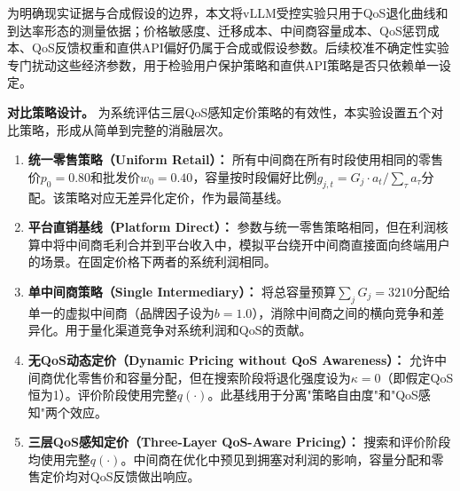 \documentclass[UTF8,11pt]{ctexart}
\newcommand{\qos}{q}
\begin{document}
为明确现实证据与合成假设的边界，本文将vLLM受控实验只用于QoS退化曲线和到达率形态的测量依据；价格敏感度、迁移成本、中间商容量成本、QoS惩罚成本、QoS反馈权重和直供API偏好仍属于合成或假设参数。后续校准不确定性实验专门扰动这些经济参数，用于检验用户保护策略和直供API策略是否只依赖单一设定。

\textbf{对比策略设计。} 为系统评估三层QoS感知定价策略的有效性，本实验设置五个对比策略，形成从简单到完整的消融层次。

\begin{enumerate}[leftmargin=2em]
  \item \textbf{统一零售策略（Uniform Retail）：} 所有中间商在所有时段使用相同的零售价$p_0=0.80$和批发价$w_0=0.40$，容量按时段偏好比例$g_{j,t}=G_j\cdot a_t/\sum_\tau a_\tau$分配。该策略对应无差异化定价，作为最简基线。
  \item \textbf{平台直销基线（Platform Direct）：} 参数与统一零售策略相同，但在利润核算中将中间商毛利合并到平台收入中，模拟平台绕开中间商直接面向终端用户的场景。在固定价格下两者的系统利润相同。
  \item \textbf{单中间商策略（Single Intermediary）：} 将总容量预算$\sum_j G_j=3210$分配给单一的虚拟中间商（品牌因子设为$b=1.0$），消除中间商之间的横向竞争和差异化。用于量化渠道竞争对系统利润和QoS的贡献。
  \item \textbf{无QoS动态定价（Dynamic Pricing without QoS Awareness）：} 允许中间商优化零售价和容量分配，但在搜索阶段将退化强度设为$\kappa=0$（即假定QoS恒为1）。评价阶段使用完整$\qos(\cdot)$。此基线用于分离"策略自由度"和"QoS感知"两个效应。
  \item \textbf{三层QoS感知定价（Three-Layer QoS-Aware Pricing）：} 搜索和评价阶段均使用完整$\qos(\cdot)$。中间商在优化中预见到拥塞对利润的影响，容量分配和零售定价均对QoS反馈做出响应。
\end{enumerate}
\end{document}
